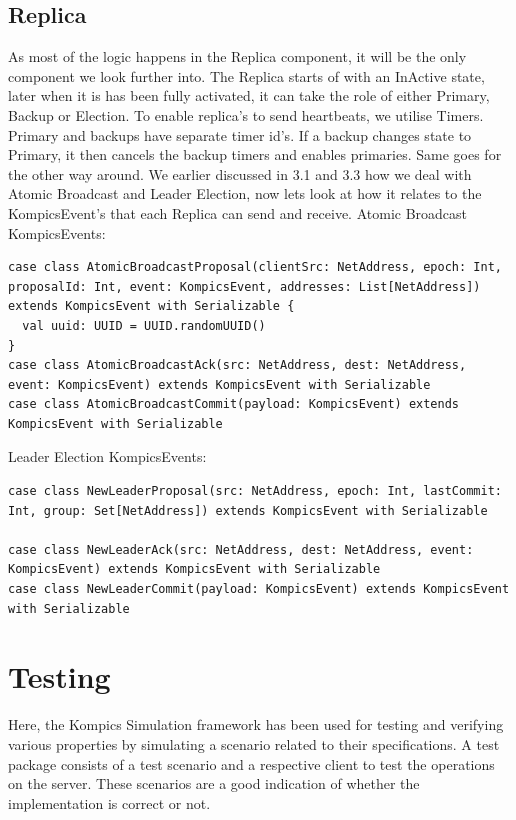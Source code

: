 \documentclass[12pt]{article}
\begin{document}
\subsection{Replica}
As most of the logic happens in the Replica component, it will be the only component we look further into.
\newline{}\newline{}
The Replica starts of with an InActive state, later when it is has been fully activated, it can take the role of either Primary, Backup or Election. To enable replica's to send heartbeats, we utilise Timers. Primary and backups have separate timer id's. If a backup changes state to Primary, it then cancels the backup timers and enables primaries. Same goes for the other way around. We earlier discussed in 3.1 and 3.3 how we deal with Atomic Broadcast and Leader Election, now lets look at how it relates to the KompicsEvent's that each Replica can send and receive.
\newline{}\newline{}
Atomic Broadcast KompicsEvents:
\begin{lstlisting}[style=myScalastyle]
case class AtomicBroadcastProposal(clientSrc: NetAddress, epoch: Int, proposalId: Int, event: KompicsEvent, addresses: List[NetAddress]) extends KompicsEvent with Serializable {
  val uuid: UUID = UUID.randomUUID()
}
case class AtomicBroadcastAck(src: NetAddress, dest: NetAddress, event: KompicsEvent) extends KompicsEvent with Serializable
case class AtomicBroadcastCommit(payload: KompicsEvent) extends KompicsEvent with Serializable

\end{lstlisting}
Leader Election KompicsEvents:
\begin{lstlisting}[style=myScalastyle]
case class NewLeaderProposal(src: NetAddress, epoch: Int, lastCommit: Int, group: Set[NetAddress]) extends KompicsEvent with Serializable

case class NewLeaderAck(src: NetAddress, dest: NetAddress, event: KompicsEvent) extends KompicsEvent with Serializable
case class NewLeaderCommit(payload: KompicsEvent) extends KompicsEvent with Serializable
\end{lstlisting}

\section{Testing}
Here, the Kompics Simulation framework has been used for testing and verifying various properties by simulating a scenario related to their specifications. A test package consists of a test scenario and a respective client to test the operations on the server. These scenarios are a good indication of whether the implementation is correct or not.
\end{document}
